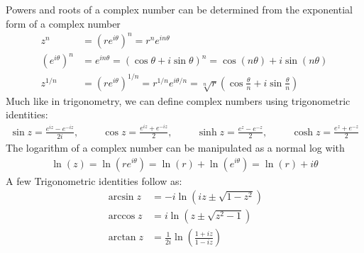 Powers and roots of a complex number can be determined from the exponential form of a complex number
\begin{align}
	z^n &= (re^{i\theta})^n = r^n e^{in\theta} \\
	(e^{i\theta})^n &= e^{in\theta} = (\cos\theta+i\sin\theta)^n = \cos (n\theta) + i\sin (n\theta) \\
	z^{1/n} &= (re^{i\theta})^{1/n} = r^{1/n} e^{i\theta/n} = \sqrt[n]{r}\left(\cos\frac{\theta}{n}+i\sin\frac{\theta}{n}\right)
\end{align}
Much like in trigonometry, we can define complex numbers using trigonometric identities:
\begin{align}
	\sin z = \frac{e^{iz}-e^{-iz}}{2i},\hspace{1cm}\cos z = \frac{e^{iz}+e^{-iz}}{2},\hspace{1cm}\sinh z = \frac{e^{z}-e^{-z}}{2},\hspace{1cm}\cosh z = \frac{e^{z}+e^{-z}}{2}
\end{align}
The logarithm of a complex number can be manipulated as a normal log with
\begin{align}
	\ln (z) = \ln(re^{i\theta}) = \ln(r)+\ln(e^{i\theta}) = \ln(r)+i\theta 
\end{align}
A few Trigonometric identities follow as:
\begin{align}
	\arcsin z &= -i \ln (iz\pm \sqrt{1-z^2})\\ \arccos z &= i \ln (z\pm \sqrt{z^2-1}) \\ \arctan z &= \frac{1}{2i} \ln \left(\frac{1+iz}{1-iz}\right)
\end{align}

